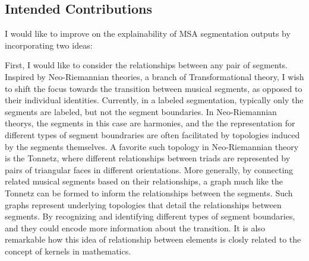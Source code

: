\subsection{Intended Contributions}
I would like to improve on the explainability of MSA segmentation outputs by incorporating two ideas:

First, I would like to consider the relationships between any pair of segments.
Inspired by Neo-Riemannian theories, a branch of Transformational theory, I wish to shift the focus towards the transition between musical segments, as opposed to their individual identities.
Currently, in a labeled segmentation, typically only the segments are labeled, but not the segment boundaries.
In Neo-Riemannian theorys, the segments in this case are harmonies, and the the representation for different types of segment boundraries are often facilitated by topologies induced by the segments themselves.
A favorite such topology in Neo-Riemannian theory is the Tonnetz, where different relationships between triads are represented by pairs of triangular faces in different orientations. 
More generally, by connecting related musical segments based on their relationships, a graph much like the Tonnetz can be formed to inform the relationships between the segments. 
Such graphs represent underlying topologies that detail the relationships between segments. 
By recognizing and identifying different types of segment boundaries, and they could encode more information about the transition.
It is also remarkable how this idea of relationship between elements is closly related to the concept of kernels in mathematics.

